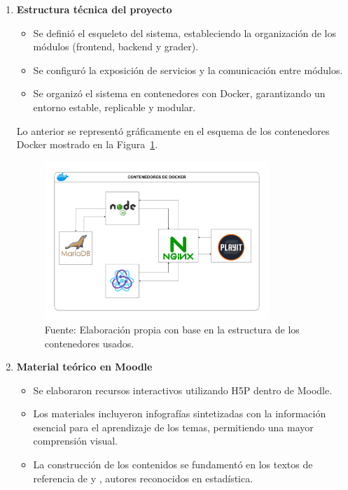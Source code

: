 \documentclass[letter,oneside,12pt,spanish]{report}
\begin{document}
\begin{enumerate}
	\item \textbf{Estructura técnica del proyecto}
	\begin{itemize}
		\item Se definió el esqueleto del sistema, estableciendo la organización de los módulos (frontend, backend y grader).
		\item Se configuró la exposición de servicios y la comunicación entre módulos.
		\item Se organizó el sistema en contenedores con Docker, garantizando un entorno estable, replicable y modular.
	\end{itemize}
	
	\noindent Lo anterior se representó gráficamente en el esquema de los contenedores Docker mostrado en la Figura~\ref{fig:Diagrama-Docker}.
	
	\begin{figure}[ht]
		\centering
		\includegraphics[width=0.8\textwidth]{Figs/Diagrama_contenedores.pdf}
		\label{fig:Diagrama-Docker}
		\\Fuente: Elaboración propia con base en la estructura de los contenedores usados.
	\end{figure}

	\item \textbf{Material teórico en Moodle}
	\begin{itemize}
		\item Se elaboraron recursos interactivos utilizando H5P dentro de Moodle.
		\item Los materiales incluyeron infografías sintetizadas con la información esencial para el aprendizaje de los temas, permitiendo una mayor comprensión visual.
		\item La construcción de los contenidos se fundamentó en los textos de referencia de \textcite{montgomery1996} y \textcite{walpole2012probabilidad}, autores reconocidos en estadística.
	\end{itemize}
	

\end{enumerate}
\end{document}
